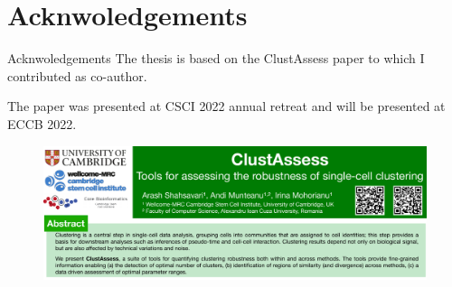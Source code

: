 \section{Acknwoledgements}

\begin{frame}{Acknwoledgements}
    The thesis is based on the ClustAssess paper to which I contributed as co-author.

    The paper was presented at CSCI 2022 annual retreat and will be presented at ECCB 2022.

    \begin{figure}
        \includegraphics[width=\textwidth]{images/ca.png}
    \end{figure}
\end{frame}